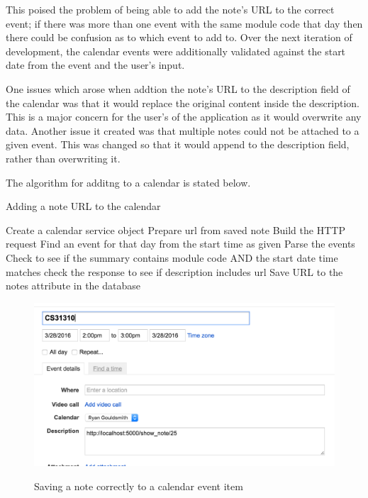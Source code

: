 {{{{{{This poised the problem of being able to add the note's URL to the correct event; if there was more than one event with the same module code that day then there could be confusion as to which event to add to.
Over the next iteration of development, the calendar events were additionally validated against the start date from the event and the user's input.

One issues which arose when addtion the note's URL to the description field of the calendar was that it would replace the original content inside the description. This is a major concern for the user's of the application as it would overwrite any data. Another issue it created was that multiple notes could not be attached to a given event. This was changed so that it would append to the description field, rather than overwriting it.

The algorithm for additng to a calendar is stated below.
\begin{algorithm}
  \caption{Adding a note URL to the calendar}
  \label{algorithm:threshold1}
  \begin{algorithmic}[1]
      \State Create a calendar service object
      \State Prepare url from saved note
      \State Build the HTTP request
      \State Find an event for that day from the start time as given
      \State Parse the events
      \State Check to see if the summary contains module code AND the start date time matches
        \State check the response to see if description includes url
        \State Save URL to the notes attribute in the database
      \EndIf
  \end{algorithmic}
\end{algorithm}

\begin{figure}[H]
  \centering
  \includegraphics[scale=0.4]{images/saved_to_calendar}
  \label{fig:saved_to_calendar}
  \caption{Saving a note correctly to a calendar event item}
\end{figure}

}}}}}}
